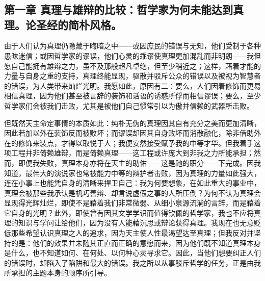\section{}


\subsection{第一章 真理与雄辩的比较：哲学家为何未能达到真理。论圣经的简朴风格。}

由于人们认为真理仍隐藏于晦暗之中——或因庶民的错误与无知，他们受制于各种愚昧迷信；或因哲学家的谬误，他们心灵的乖谬使真理更加混乱而非明朗——我但愿自己能拥有雄辩之力，虽不及那般超凡卓绝，但至少稍近之；这样，藉着才能的力量与自身之重的支持，真理终能显现，驱散并驳斥公众的错误以及被视为智慧者的错误，为人类带来灿烂光明。我愿如此，原因有二：要么，人们因着修饰而更易相信真理，因为他们甚至被言辞的装饰和话语的诱惑所俘而相信谬误；要么，至少哲学家们会被我们击败，尤其是被他们自己惯常引以为傲并信赖的武器所击败。\par

但既然天主命定事情的本质如此：纯朴无伪的真理因其自有充分之美而更加清晰，因此若加以外在装饰反而被败坏；而谬误却因其自身败坏而消散融化，除非借助外在的修饰来装点，才得以取悦于人；我便安然接受赋予我的中等才华。但我着手这项工程并非倚赖雄辩，而是倚赖真理——这工程或许庞大到非我之力所能承担；然而，即便我失败，真理本身亦将在天主的助佑——这是祂的职分——下完成。因我知道，最伟大的演说家也常被能力中等的辩护者击败，因为真理的力量如此强大，连在小事上也能凭自身的清晰来捍卫自己：我为何要想象，在如此重大的事业中，真理会被那些我承认是机巧善辩、却言说虚假之事的人所压倒？为何不认为真理会显现得光辉灿烂，即使不是藉着我们非常微弱、从细小泉源流淌的言辞，而是藉着它自身的光明？此外，即使曾有因其文学学识而值得钦佩的哲学家，我也不应将真理的知识与学问让给他们，因为没有人能藉沉思或辩论获得真理。我现在也无意贬低那些希望认识真理之人的追求，因为天主使人性最渴望达至真理；但我反对并坚持的是：他们的效果并未随其正直而正确的意愿而来，因为他们既不知道真理本身是什么，也不知道如何、在何处、以何种心灵寻求它。因此，当他们想要纠正人们的错误时，却陷入了陷阱和最大的错误。我之所以从事驳斥哲学的任务，正是由我所承担的主题本身的顺序所引导。\par


